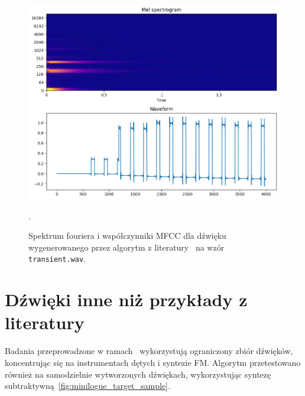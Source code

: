 \begin{multicols}{3}
\begin{figure}[H]
    \centering
    \includegraphics[width=0.9\linewidth]{rys06/macret_evolved_transient.png}
    \caption{
      Spektrum fouriera i współczynniki MFCC dla dźwięku wygenerowanego 
      przez algorytm z literatury~\cite{evolutionary_puredata} na wzór
      \texttt{transient.wav}.
    }\label{fig:evolved_literature_transient_sound_overview}.
\end{figure}
\end{multicols}

\section{Dźwięki inne niż przykłady z literatury}\label{sec:non_literature_samples}

Badania przeprowadzone w ramach~\cite{evolutionary_puredata}
wykorzystują ograniczony zbiór dźwięków, koncentrując
się na instrumentach dętych i syntezie FM\@. Algorytm przetestowano
również na samodzielnie wytworzonych dźwiękach, wykorzystując syntezę
subtraktywną~\ref{fig:minilogue_target_sample}.

